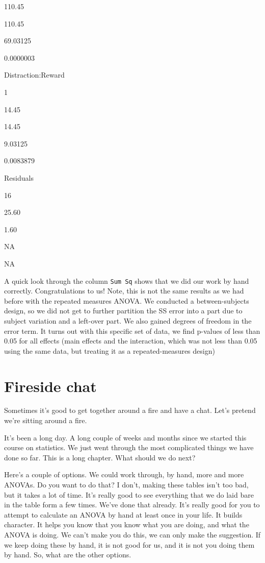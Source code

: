 \documentclass[
]{book}
\begin{document}
110.45

110.45

69.03125

0.0000003

Distraction:Reward

1

14.45

14.45

9.03125

0.0083879

Residuals

16

25.60

1.60

NA

NA

A quick look through the column \texttt{Sum\ Sq} shows that we did our work by hand correctly. Congratulations to us! Note, this is not the same results as we had before with the repeated measures ANOVA. We conducted a between-subjects design, so we did not get to further partition the SS error into a part due to subject variation and a left-over part. We also gained degrees of freedom in the error term. It turns out with this specific set of data, we find p-values of less than 0.05 for all effects (main effects and the interaction, which was not less than 0.05 using the same data, but treating it as a repeated-measures design)

\hypertarget{fireside-chat}{%
\section{Fireside chat}\label{fireside-chat}}

Sometimes it's good to get together around a fire and have a chat. Let's pretend we're sitting around a fire.

It's been a long day. A long couple of weeks and months since we started this course on statistics. We just went through the most complicated things we have done so far. This is a long chapter. What should we do next?

Here's a couple of options. We could work through, by hand, more and more ANOVAs. Do you want to do that? I don't, making these tables isn't too bad, but it takes a lot of time. It's really good to see everything that we do laid bare in the table form a few times. We've done that already. It's really good for you to attempt to calculate an ANOVA by hand at least once in your life. It builds character. It helps you know that you know what you are doing, and what the ANOVA is doing. We can't make you do this, we can only make the suggestion. If we keep doing these by hand, it is not good for us, and it is not you doing them by hand. So, what are the other options.
\end{document}
